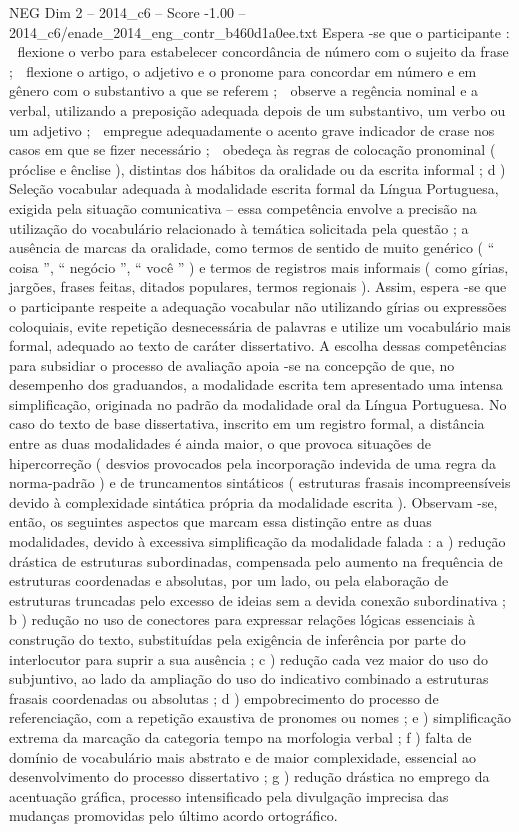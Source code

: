 \begin{textsample}{NEG Dim 2 – 2014\_c6 – Score -1.00 – 2014\_c6/enade\_2014\_eng\_contr\_b460d1a0ee.txt}
Espera -se que o participante :  flexione o verbo para estabelecer concordância de número com o sujeito da frase ;  flexione o artigo, o adjetivo e o pronome para concordar em número e em gênero com o substantivo a que se referem ;  observe a regência nominal e a verbal, utilizando a preposição adequada depois de um substantivo, um verbo ou um adjetivo ;  empregue adequadamente o acento grave indicador de crase nos casos em que se fizer necessário ;  obedeça às regras de colocação pronominal ( próclise e ênclise ), distintas dos hábitos da oralidade ou da escrita informal ; d ) Seleção vocabular adequada à modalidade escrita formal da Língua Portuguesa, exigida pela situação comunicativa – essa competência envolve a precisão na utilização do vocabulário relacionado à temática solicitada pela questão ; a ausência de marcas da oralidade, como termos de sentido de muito genérico ( “ coisa ”, “ negócio ”, “ você ” ) e termos de registros mais informais ( como gírias, jargões, frases feitas, ditados populares, termos regionais ).
Assim, espera -se que o participante respeite a adequação vocabular não utilizando gírias ou expressões coloquiais, evite repetição desnecessária de palavras e utilize um vocabulário mais formal, adequado ao texto de caráter dissertativo.
A escolha dessas competências para subsidiar o processo de avaliação apoia -se na concepção de que, no desempenho dos graduandos, a modalidade escrita tem apresentado uma intensa simplificação, originada no padrão da modalidade oral da Língua Portuguesa.
No caso do texto de base dissertativa, inscrito em um registro formal, a distância entre as duas modalidades é ainda maior, o que provoca situações de hipercorreção ( desvios provocados pela incorporação indevida de uma regra da norma-padrão ) e de truncamentos sintáticos ( estruturas frasais incompreensíveis devido à complexidade sintática própria da modalidade escrita ).
Observam -se, então, os seguintes aspectos que marcam essa distinção entre as duas modalidades, devido à excessiva simplificação da modalidade falada : a ) redução drástica de estruturas subordinadas, compensada pelo aumento na frequência de estruturas coordenadas e absolutas, por um lado, ou pela elaboração de estruturas truncadas pelo excesso de ideias sem a devida conexão subordinativa ; b ) redução no uso de conectores para expressar relações lógicas essenciais à construção do texto, substituídas pela exigência de inferência por parte do interlocutor para suprir a sua ausência ; c ) redução cada vez maior do uso do subjuntivo, ao lado da ampliação do uso do indicativo combinado a estruturas frasais coordenadas ou absolutas ; d ) empobrecimento do processo de referenciação, com a repetição exaustiva de pronomes ou nomes ; e ) simplificação extrema da marcação da categoria tempo na morfologia verbal ; f ) falta de domínio de vocabulário mais abstrato e de maior complexidade, essencial ao desenvolvimento do processo dissertativo ; g ) redução drástica no emprego da acentuação gráfica, processo intensificado pela divulgação imprecisa das mudanças promovidas pelo último acordo ortográfico.

\end{textsample}
